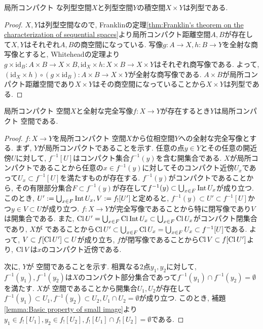 \documentclass[uplatex, dvipdfmx, a4paper, 12pt, class=jsbook, crop=false]{standalone}
\begin{document}
\begin{theorem}[Boehme]
	局所コンパクト \Hausdorff な列型空間$ X $と列型空間$ Y $の積空間$ X \times Y $は列型である.
\end{theorem}

\begin{proof}
	$ X, Y $は列型空間なので, Franklinの定理\ref{thm:Franklin's theorem on the characterization of sequential spaces}より局所コンパクト距離空間$ A, B $が存在して$ X, Y $はそれぞれ$ A, B $の商空間になっている. 写像$ g \colon A \to X, h \colon B \to Y $を全射な商写像とすると, Whiteheadの定理より$ g \times \mathrm{id}_B \colon A \times B \to X \times B, \mathrm{id}_X \times h \colon X \times B \to X \times Y $はそれぞれ商写像である. よって, $ (\mathrm{id}_X \times h) \circ (g \times \mathrm{id}_B) \colon A \times B \to X \times Y $が全射な商写像である. $ A \times B $が局所コンパクト距離空間であり$ X \times Y $はその商空間になっていることから$ X \times Y $は列型である.
\end{proof}

\begin{proposition}
	\label{prop:Perfect image of a locally compact Hausdorff space}
	局所コンパクト \Hausdorff 空間$ X $と全射な完全写像$ f \colon X \to Y $が存在するとき$ Y $は局所コンパクト \Hausdorff 空間である.
\end{proposition}

\begin{proof}
	$ f \colon X \to Y $を局所コンパクト \Hausdorff 空間$ X $から位相空間$ Y $への全射な完全写像とする. まず, $ Y $が局所コンパクトであることを示す. 任意の点$ y \in Y $とその任意の開近傍$ U $に対して, $ f^{-1}[U] $はコンパクト集合$ f^{-1}(y) $を含む開集合である. $ X $が局所コンパクトであることから任意の$ x \in f^{-1}(y) $に対してそのコンパクト近傍$ U_x $であって$ U_x \subset f^{-1}[U] $を満たすものが存在する. $ f^{-1}(y) $がコンパクトであることから, その有限部分集合$ F \subset f^{-1}(y) $が存在して$ f^{-1}(y) \subset \bigcup_{x \in F} \mathop{\mathrm{Int}}\nolimits U_x $が成り立つ. このとき, $ U' \mathrel{:=} \bigcup_{x \in F} \mathop{\mathrm{Int}}\nolimits U_x, V \mathrel{:=} f_![U'] $と定めると, $ f^{-1}(y) \subset U' \subset f^{-1}[U] $かつ$ y \in V \subset U $が成り立つ. $ f \colon X \to Y $が完全写像であることから特に閉写像であり$ V $は開集合である. また, $ \mathop{\mathrm{Cl}}\nolimits U' = \bigcup_{x \in F} \mathop{\mathrm{Cl}}\nolimits \mathop{\mathrm{Int}}\nolimits U_x \subset \bigcup_{x \in F} \mathop{\mathrm{Cl}}\nolimits U_x $がコンパクト閉集合であり, $ X $が \Hausdorff であることから$ \mathop{\mathrm{Cl}}\nolimits U' \subset \bigcup_{x \in F} \mathop{\mathrm{Cl}}\nolimits U_x = \bigcup_{x \in F} U_x \subset f^{-1}[U] $である. よって, $ V \subset f[\mathop{\mathrm{Cl}}\nolimits U'] \subset U $が成り立ち, $ f $が閉写像であることから$ \mathop{\mathrm{Cl}}\nolimits V \subset f[\mathop{\mathrm{Cl}}\nolimits U'] $より, $ \mathop{\mathrm{Cl}}\nolimits V $は$ x $のコンパクト近傍である. 
	
	次に, $ Y $が \Hausdorff 空間であることを示す. 相異なる2点$ y_1, y_2 $に対して, $ f^{-1}(y_1), f^{-1}(y_2) $は$ X $のコンパクト部分集合であって$ f^{-1}(y_1) \cap f^{-1}(y_2) = \emptyset $を満たす. $ X $が \Hausdorff 空間であることから開集合$ U_1, U_2 $が存在して$ f^{-1}(y_1) \subset U_1, f^{-1}(y_2) \subset U_2, U_1 \cap U_2 = \emptyset $が成り立つ. このとき, 補題\ref{lemma:Basic property of small image}より$ y_1 \in f_![U_1], y_2 \in f_![U_2], f_![U_1] \cap f_![U_2] = \emptyset $である.
	
\end{proof}
\end{document}
